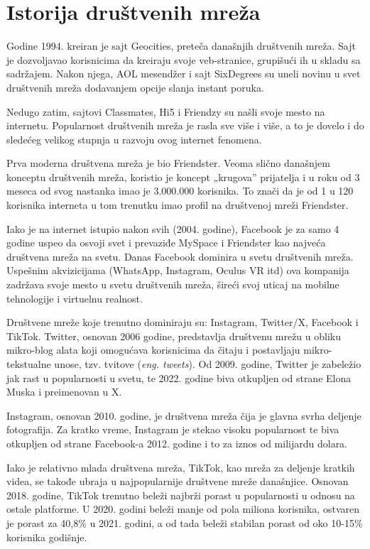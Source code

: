 \documentclass[12pt, a4paper]{article}
\begin{document}
{\section{Istorija društvenih mreža}

Godine 1994. kreiran je sajt Geocities, preteča današnjih društvenih mreža. Sajt je dozvoljavao korisnicima da kreiraju svoje veb-stranice, grupišući ih u skladu sa sadržajem. Nakon njega, AOL mesendžer i sajt SixDegrees su uneli novinu u svet društvenih mreža dodavanjem opcije slanja instant poruka.

Nedugo zatim, sajtovi Classmates, Hi5 i Friendzy su našli svoje mesto na internetu. Popularnost društvenih mreža je rasla sve više i više, a to je dovelo i do sledećeg velikog stupnja u razvoju ovog internet fenomena.

Prva moderna društvena mreža je bio Friendster. Veoma slično današnjem konceptu društvenih mreža, koristio je koncept „krugova” prijatelja i u roku od 3 meseca od svog nastanka imao je 3.000.000 korisnika. To znači da je od 1 u 120 korisnika interneta u tom trenutku imao profil na društvenoj mreži Friendster.

Iako je na internet istupio nakon svih (2004. godine), Facebook je za samo 4 godine uspeo da osvoji svet i prevaziđe MySpace i Friendster kao najveća društvena mreža na svetu. Danas Facebook dominira u svetu društvenih mreža. Uspešnim akvizicijama (WhatsApp, Instagram, Oculus VR itd) ova kompanija zadržava svoje mesto u svetu društvenih mreža, šireći svoj uticaj na mobilne tehnologije i virtuelnu realnost.\cite{istorija}

Društvene mreže koje trenutno dominiraju su: Instagram, Twitter/X, Facebook i TikTok.
Twitter, osnovan 2006 godine, predstavlja društvenu mrežu u obliku mikro-blog alata koji omogućava korisnicima da čitaju i postavljaju mikro-tekstualne unose, tzv. tvitove (\textit{eng. tweets}). Od 2009. godine, Twitter je zabeležio jak rast u popularnosti u svetu, te 2022. godine biva otkupljen od strane Elona Muska i preimenovan u X.

Instagram, osnovan 2010. godine, je društvena mreža čija je glavna svrha deljenje fotografija. Za kratko vreme, Instagram je stekao visoku popularnost te biva otkupljen od strane Facebook-a 2012. godine i to za iznos od milijardu dolara.

Iako je relativno mlada društvena mreža, TikTok, kao mreža za deljenje kratkih videa, se takođe ubraja u najpopularnije društvene mreže današnjice. Osnovan 2018. godine, TikTok trenutno beleži najbrži porast u popularnosti u odnosu na ostale platforme. U 2020. godini beleži manje od pola miliona korisnika, ostvaren je porast za 40,8\% u 2021. godini, a od tada beleži stabilan porast od oko 10-15\% korisnika godišnje.


}
\end{document}
